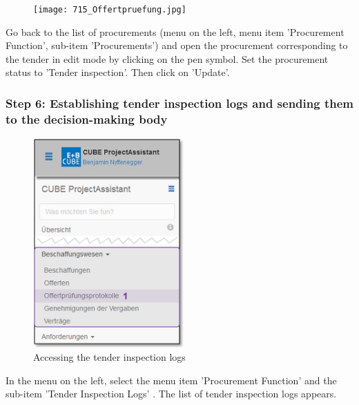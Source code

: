 \vspace{\baselineskip}

\begin{figure}
\vspace{-15pt}
\texttt{[image: 715\_Offertpruefung.jpg]}
\end{figure}
Go back to the list of procurements (menu on the left, menu item 'Procurement Function', sub-item 'Procurements') and open the procurement corresponding to the tender in edit mode by clicking on the pen symbol. Set the procurement status to 'Tender inspection'. Then click on 'Update'.

\vspace{\baselineskip}

\pagebreak
\subsubsection{Step 6: Establishing tender inspection logs and sending them to the decision-making body}

\begin{figure}
  \vspace{-30pt}      %
  \begin{center}
    \includegraphics[height=80mm]{../chapters/07_Beschaffungswesen/pictures/7-1-6_Menu_Besch_Offertp.jpg}
  \end{center}
  \vspace{-20pt}
  \caption{Accessing the tender inspection logs}
  \vspace{-10pt}
\end{figure}

In the menu on the left, select the menu item 'Procurement Function' and the sub-item 'Tender Inspection Logs' . The list of tender inspection logs appears.

